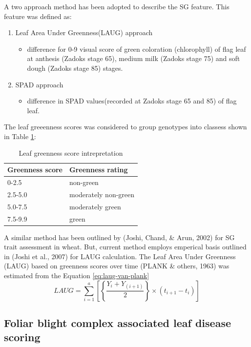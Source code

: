 \documentclass[12pt,oneside]{dukestatscithesis} %
\providecommand{\tightlist}{%
  \setlength{\itemsep}{0pt}\setlength{\parskip}{0pt}}
\theoremstyle{definition}
\theoremstyle{definition}
\theoremstyle{definition}
\theoremstyle{remark}
\begin{document}
A two approach method has been adopted to describe the SG feature. This
feature was defined as:
\begin{enumerate}
\def\labelenumi{\arabic{enumi}.}
\item
  Leaf Area Under Greenness(LAUG) approach
  \begin{itemize}
  \tightlist
  \item
    difference for 0-9 visual score of green coloration (chlorophyll) of
    flag leaf at anthesis (Zadoks stage 65), medium milk (Zadoks stage
    75) and soft dough (Zadoks stage 85) stages.
  \end{itemize}
\item
  SPAD approach
  \begin{itemize}
  \tightlist
  \item
    difference in SPAD values(recorded at Zadoks stage 65 and 85) of
    flag leaf.
  \end{itemize}
\end{enumerate}
The leaf greeenness scores was considered to group genotypes into
classess shown in Table \ref{tab:leaf-greenness}:
\begin{table}[H]

\caption{\label{tab:leaf-greenness}Leaf greenness score intrepretation}
\centering
\begin{tabular}[t]{ll}
\toprule
\textbf{Greenness score} & \textbf{Greenness rating}\\
\midrule
0-2.5 & non-green\\
2.5-5.0 & moderately non-green\\
5.0-7.5 & moderately green\\
7.5-9.9 & green\\
\bottomrule
\end{tabular}
\end{table}
A similar method has been outlined by (Joshi, Chand, \& Arun, 2002) for
SG trait assessment in wheat. But, current method employs emperical
basis outlined in (Joshi et al., 2007) for LAUG calculation. The Leaf
Area Under Greenness (LAUG) based on greenness scores over time (PLANK
\& others, 1963) was estimated from the Equation \eqref{eq:laug-van-plank}
\begin{equation}
LAUG = \sum_{i = 1}^a \left [\left\{ \frac{Y_i + Y_{(i+1)}}{2}\right\} \times (t_{i+1}-t_i)\right ]
\label{eq:laug-van-plank}
\end{equation}
\subsection{Foliar blight complex associated leaf disease
scoring}\label{foliar-blight-complex-associated-leaf-disease-scoring}
\end{document}
